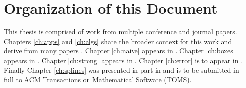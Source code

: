 \section{Organization of this Document}

This thesis is comprised of work from multiple conference and journal
papers. Chapters \ref{ch:apps} and \ref{ch:algs} share the broader
context for this work and derive from many papers
\cite{lux2018predictive,lux2020effective,lux2020interpolation}. Chapter
\ref{ch:naive} appears in \cite{lux2018predictive}. Chapter
\ref{ch:boxes} appears in \cite{lux2018novel}. Chapter \ref{ch:strong}
appears in \cite{lux2018nonparametric}. Chapter \ref{ch:error} is to
appear in \cite{lux2020interpolation}. Finally Chapter
\ref{ch:splines} was presented in part in \cite{lux2020algorithm} and
is to be submitted in full to ACM Transactions on Mathematical
Software (TOMS).

